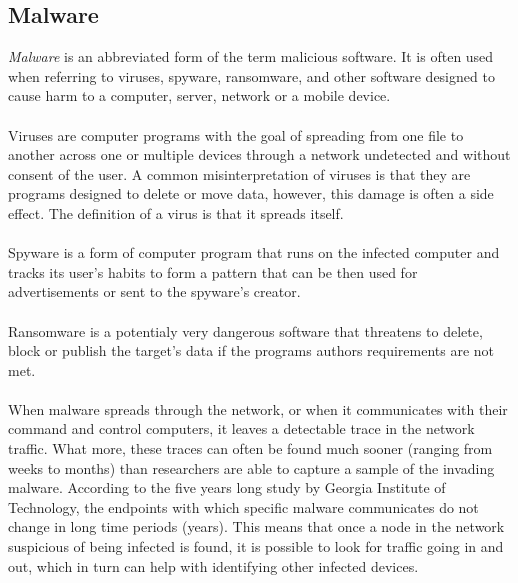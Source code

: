 \documentclass[11pt]{article}
\begin{document}
    \subsection{Malware}
      {\it Malware} is an abbreviated form of the term malicious software. It is often used when referring to viruses, spyware, ransomware, and other software designed to cause harm to a computer, server, network or a mobile device. \cite{malware}
      \\~\\
      Viruses are computer programs with the goal of spreading from one file to another across one or multiple devices through a network undetected and without consent of the user. A common misinterpretation of viruses is that they are programs designed to delete or move data, however, this damage is often a side effect. The definition of a virus is that it spreads itself. \cite{malware}
      \\~\\
      Spyware is a form of computer program that runs on the infected computer and tracks its user's habits to form a pattern that can be then used for advertisements or sent to the spyware's creator. \cite{malware}
      \\~\\
      Ransomware is a potentialy very dangerous software that threatens to delete, block or publish the target's data if the programs authors requirements are not met. \cite{ransomware}
      \\~\\
      When malware spreads through the network, or when it communicates with their command and control computers, it leaves a detectable trace in the network traffic. What more, these traces can often be found much sooner (ranging from weeks to months) than researchers are able to capture a sample of the invading malware. \cite{network} According to the five years long study by Georgia Institute of Technology, the endpoints with which specific malware communicates do not change in long time periods (years). This means that once a node in the network suspicious of being infected is found, it is possible to look for traffic going in and out, which in turn can help with identifying other infected devices. \cite{network}
      \newpage
\end{document}
